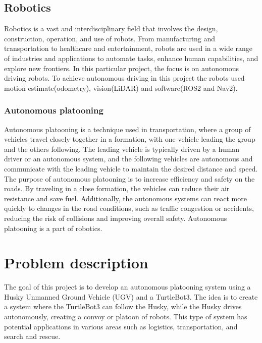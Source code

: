 \subsection{Robotics} %
Robotics is a vast and interdisciplinary field that involves the design, construction, operation, and use of robots. From manufacturing and transportation to healthcare and entertainment, robots are used in a wide range of industries and applications to automate tasks, enhance human capabilities, and explore new frontiers.
In this particular project, the focus is on autonomous driving robots. To achieve autonomous driving in this project the robots used motion estimate(odometry), vision(LiDAR) and software(ROS2 and Nav2). 

\subsubsection{Autonomous platooning}
Autonomous platooning is a technique used in transportation, where a group of vehicles travel closely together in a formation, with one vehicle leading the group and the others following. The leading vehicle is typically driven by a human driver or an autonomous system, and the following vehicles are autonomous and communicate with the leading vehicle to maintain the desired distance and speed. The purpose of autonomous platooning is to increase efficiency and safety on the roads. By traveling in a close formation, the vehicles can reduce their air resistance and save fuel. Additionally, the autonomous systems can react more quickly to changes in the road conditions, such as traffic congestion or accidents, reducing the risk of collisions and improving overall safety. Autonomous platooning is a part of robotics.



\section{Problem description}
The goal of this project is to develop an autonomous platooning system using a Husky Unmanned Ground Vehicle (UGV) and a TurtleBot3. The idea is to create a system where the TurtleBot3 can follow the Husky, while the Husky drives autonomously, creating a convoy or platoon of robots. This type of system has potential applications in various areas such as logistics, transportation, and search and rescue.


